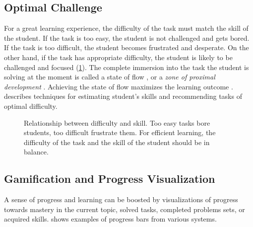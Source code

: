 \subsection{Optimal Challenge}  %
\label{sec:motivation.challenge}
For a great learning experience,
  the difficulty of the task must match the skill of the student.
If the task is too easy,
  the student is not challenged and gets bored.
If the task is too difficult,
  the student becomes frustrated and desperate.
On the other hand, if the task has appropriate difficulty,
  the student is likely to be challenged and focused
  (\cref{fig:flow}).
The complete immersion into the task the student is solving at the moment is called
  a state of flow \cite{flow},
  or a \emph{zone of proximal development} \cite{zone-of-proximal-development}.
Achieving the state of flow maximizes the learning outcome \cite{adaptive-practice}.
 describes techniques for estimating student's skills
and recommending tasks of optimal difficulty.

\begin{figure}[htb]
  \centering
  \caption{
    Relationship between difficulty and skill.
    Too easy tasks bore students, too difficult frustrate them.
    For efficient learning, the difficulty of the task
    and the skill of the student should be in balance.
  }
  \label{fig:flow}
\end{figure}



\subsection{Gamification and Progress Visualization}

A sense of progress and learning can be boosted by visualizations of
progress towards mastery in the current topic, solved tasks, completed problems sets,
or acquired skills.
 shows examples of progress bars from various systems.


